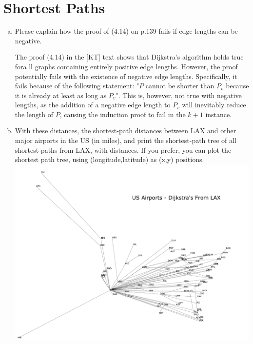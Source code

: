 \documentclass[12pt]{article}
\begin{document}
\section{Shortest Paths}\label{shortest paths}
\begin{enumerate}[(a)]
\item Please explain how the proof of (4.14) on p.139 fails if edge lengths can be negative.
\begin{addmargin}[2em]{2em}
The proof (4.14) in the [KT] text shows that Dijkstra's algorithm holds true fora ll graphs containing entirely positive edge lengths. However, the proof potentially fails with the existence of negative edge lengths. Specifically, it fails because of the following statement: "$P$ cannot be shorter than $P_v$ because it is already at least as long as $P_v$". This is, however, not true with negative lengths, as the addition of a negative edge length to $P_v$ will inevitably reduce the length of $P$, causing the induction proof to fail in the $k + 1$ instance.
\end{addmargin}
\item With these distances, the shortest-path distances between LAX and other major airports in the US (in miles), and print the shortest-path tree of all shortest paths from LAX, with distances. If you prefer, you can plot the shortest path tree, using (longitude,latitude) as (x,y) positions.\\
\includegraphics[width=\textwidth]{dijkstras-lax}
\end{enumerate}
\end{document}
